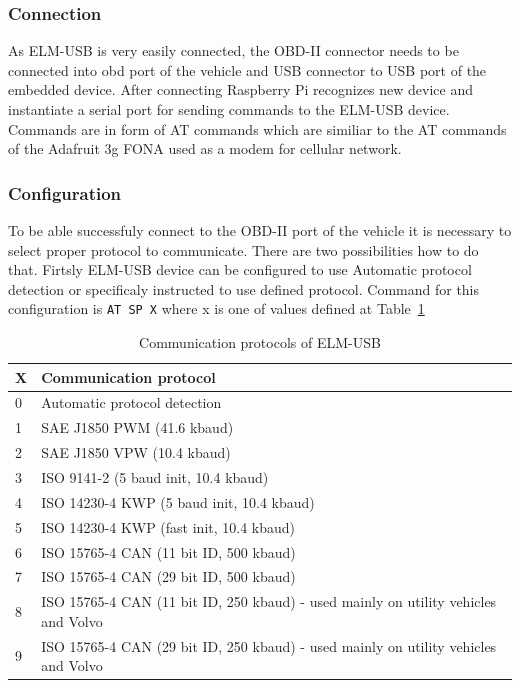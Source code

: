 \subsubsection{Connection} %
\label{ssub:connection}
As ELM-USB is very easily connected, the OBD-II connector needs to be connected into \gls{obd} port of the vehicle and USB connector to USB port of the embedded device. After connecting Raspberry Pi recognizes new device and instantiate a serial port for sending commands to the ELM-USB device. Commands are in form of AT commands which are similiar to the AT commands of the Adafruit 3g FONA used as a modem for cellular network.
\subsubsection{Configuration} %
\label{ssub:configuration}
To be able successfuly connect to the OBD-II port of the vehicle it is necessary to select proper protocol to communicate. There are two possibilities how to do that. Firtsly ELM-USB device can be configured to use Automatic protocol detection or specificaly instructed to use defined protocol. Command for this configuration is \verb|AT SP X|\cite{at_cmd} where x is one of values defined at Table~\ref{tab:tab3}
\begin{table}[H]
 \begin{center}
   \begin{tabular}{l l}
   X & Communication protocol\\
   \hline
	0 & Automatic protocol detection \\
	1 & SAE J1850 PWM (41.6 kbaud) \\
	2 & SAE J1850 VPW (10.4 kbaud) \\
	3 & ISO 9141-2 (5 baud init, 10.4 kbaud) \\
	4 & ISO 14230-4 KWP (5 baud init, 10.4 kbaud) \\
	5 & ISO 14230-4 KWP (fast init, 10.4 kbaud) \\
	6 & ISO 15765-4 CAN (11 bit ID, 500 kbaud) \\
	7 & ISO 15765-4 CAN (29 bit ID, 500 kbaud) \\
	8 & ISO 15765-4 CAN (11 bit ID, 250 kbaud) - used mainly on utility vehicles and Volvo \\
	9 & ISO 15765-4 CAN (29 bit ID, 250 kbaud) - used mainly on utility vehicles and Volvo \\
   \hline
   \end{tabular}
 \end{center}
 \caption{Communication protocols of ELM-USB}
 \label{tab:tab3}
\end{table}

